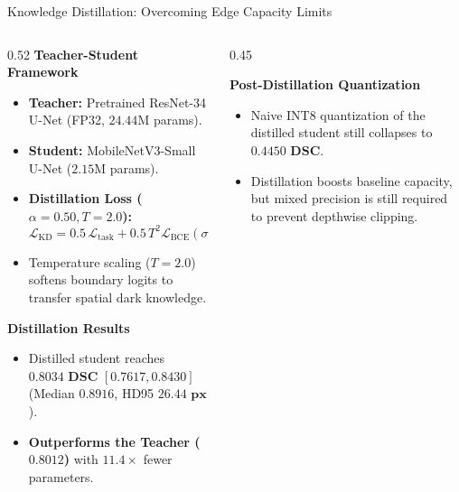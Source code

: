 \documentclass[aspectratio=169, 10pt]{beamer}
\begin{document}
\begin{frame}{Knowledge Distillation: Overcoming Edge Capacity Limits}
\begin{columns}[T, onlytextwidth]
  \begin{column}{0.52\textwidth}
    \textbf{Teacher-Student Framework}
    \begin{itemize}\setlength{\itemsep}{3pt}\footnotesize
      \item \textbf{Teacher:} Pretrained ResNet-34 U-Net (FP32, $24.44\text{M}$ params).
      \item \textbf{Student:} MobileNetV3-Small U-Net ($2.15\text{M}$ params).
      \item \textbf{Distillation Loss ($\alpha=0.50, T=2.0$):}
        $$\textstyle \mathcal{L}_{\text{KD}} = 0.5\,\mathcal{L}_{\text{task}} + 0.5\,T^2 \mathcal{L}_{\text{BCE}}\left(\sigma(z_s/T),\; \sigma(z_t/T)\right)$$
      \item Temperature scaling ($T=2.0$) softens boundary logits to transfer spatial dark knowledge.
    \end{itemize}

    \vspace{0.6em}

    \textbf{Distillation Results}
    \begin{itemize}\setlength{\itemsep}{3pt}\footnotesize
      \item Distilled student reaches $\mathbf{0.8034\text{ DSC}}$ $[0.7617, 0.8430]$ (Median $\mathbf{0.8916}$, HD95 $\mathbf{26.44\text{ px}}$).
      \item \textbf{Outperforms the Teacher ($0.8012$)} with $11.4\times$ fewer parameters.
    \end{itemize}
  \end{column}

  \begin{column}{0.45\textwidth}
    \centering
    

    \vspace{0.6em}
    \raggedright
    \textbf{Post-Distillation Quantization}
    \begin{itemize}\setlength{\itemsep}{3pt}\footnotesize
      \item Naive INT8 quantization of the distilled student still collapses to $\mathbf{0.4450\text{ DSC}}$.
      \item Distillation boosts baseline capacity, but mixed precision is still required to prevent depthwise clipping.
    \end{itemize}
  \end{column}
\end{columns}
\end{frame}
\end{document}
